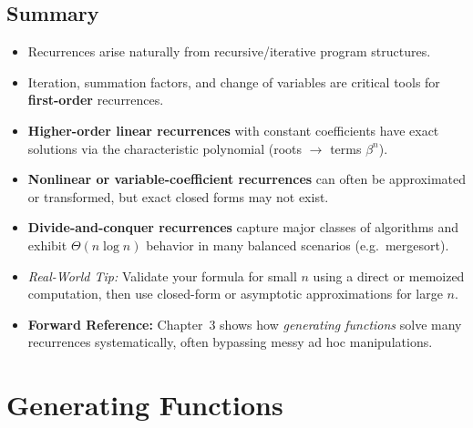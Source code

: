 \documentclass[11pt,letterpaper]{article}
\begin{document}
\subsection{Summary}
\begin{itemize}
  \item Recurrences arise naturally from recursive/iterative program structures.
  \item Iteration, summation factors, and change of variables are critical tools for \textbf{first-order} recurrences.
  \item \textbf{Higher-order linear recurrences} with constant coefficients have exact solutions via the characteristic polynomial (roots \(\rightarrow\) terms \(\beta^n\)).
  \item \textbf{Nonlinear or variable-coefficient recurrences} can often be approximated or transformed, but exact closed forms may not exist.
  \item \textbf{Divide-and-conquer recurrences} capture major classes of algorithms and exhibit \(\Theta(n\log n)\) behavior in many balanced scenarios (e.g.\ mergesort).
  \item \emph{Real-World Tip:} Validate your formula for small \(n\) using a direct or memoized computation, then use closed-form or asymptotic approximations for large \(n\).
  \item \textbf{Forward Reference:} Chapter~3 shows how \emph{generating functions} solve many recurrences systematically, often bypassing messy ad hoc manipulations.
\end{itemize}
\clearpage


\section{Generating Functions}
\end{document}
